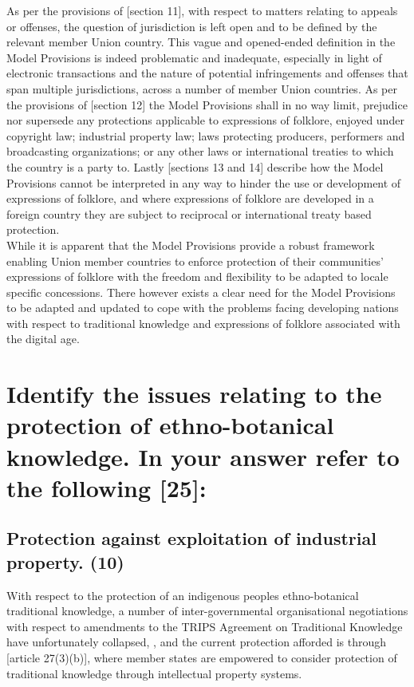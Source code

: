 \documentclass[11pt]{article}
\begin{document}
As per the provisions of [section
11]\cite{wipo85_model_provi_national_laws_folklore}, with respect to matters
relating to appeals or offenses, the question of jurisdiction is left open and
to be defined by the relevant member Union country. This vague and opened-ended
definition in the Model Provisions is indeed problematic and inadequate,
especially in light of electronic transactions and the nature of potential
infringements and offenses that span multiple jurisdictions, across a number of
member Union countries. As per the provisions of [section
12]\cite{wipo85_model_provi_national_laws_folklore} the Model Provisions shall in
no way limit, prejudice nor supersede any protections applicable to expressions
of folklore, enjoyed under copyright law; industrial property law; laws
protecting producers, performers and broadcasting organizations; or any other
laws or international treaties to which the country is a party to. Lastly
[sections 13 and 14]\cite{wipo85_model_provi_national_laws_folklore} describe how
the Model Provisions cannot be interpreted in any way to hinder the use or
development of expressions of folklore, and where expressions of folklore are
developed in a foreign country they are subject to reciprocal or international
treaty based protection.\\

While it is apparent that the Model Provisions provide a robust framework
enabling Union member countries to enforce protection of their communities'
expressions of folklore with the freedom and flexibility to be adapted to locale
specific concessions. There however exists a clear need for the Model Provisions
to be adapted and updated to cope with the problems facing developing nations
with respect to traditional knowledge and expressions of folklore associated
with the digital age.

\section{Identify the issues relating to the protection of ethno-botanical knowledge. In your answer refer to the following [25]:}
\label{sec:org19732ea}

\subsection{Protection against exploitation of industrial property. (10)}
\label{sec:org498c0d3}

With respect to the protection of an indigenous peoples ethno-botanical traditional knowledge, a number of inter-governmental organisational
negotiations with respect to amendments to the TRIPS \cite{wto17_trips} Agreement
on Traditional Knowledge have unfortunately collapsed,
\cite{saurombe09_protection_indigenous_trad_knowl_through_ip}, and the current
protection afforded is through [article 27(3)(b)]\cite{wto17_trips}, where member
states are empowered to consider protection of traditional knowledge through
intellectual property systems.\\
\end{document}
